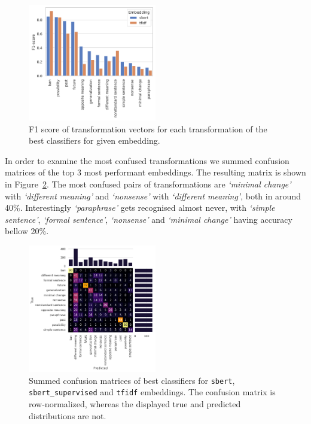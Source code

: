 \documentclass[11pt]{article}
\newcommand{\Embed}[1]{\texttt{#1}}
\newcommand{\Trans}[1]{\textsl{`#1'}}
\begin{document}
\begin{figure}[htp]
  \centering
  \includegraphics[width=0.5\textwidth]{./figs/cls_gs_diff_labels.png}

  \caption{F1 score of transformation vectors for each transformation of the
  best classifiers for given embedding.}\label{fig:cls_gs_diff_labels}

\end{figure}

In order to examine the most confused transformations we summed confusion
matrices of the top 3 most performant embeddings. The resulting matrix is shown
in Figure~\ref{fig:cls_gs_diff_conf_mat}. The most confused pairs of
transformations are \Trans{minimal change} with \Trans{different meaning} and
\Trans{nonsense} with \Trans{different meaning}, both in around 40\%.
Interestingly \Trans{paraphrase} gets recognised almost never, with
\Trans{simple sentence}, \Trans{formal sentence}, \Trans{nonsense} and
\Trans{minimal change} having accuracy bellow 20\%.

\begin{figure}[htp]
  \centering
  \includegraphics[width=0.5\textwidth]{./figs/cls_gs_diff_conf_mat.png}
  \caption{Summed confusion matrices of best classifiers for \Embed{sbert},
  \Embed{sbert\_supervised} and \Embed{tfidf} embeddings. The confusion matrix
  is row-normalized, whereas the displayed true and predicted distributions are
  not.}\label{fig:cls_gs_diff_conf_mat}
\end{figure}
\end{document}
